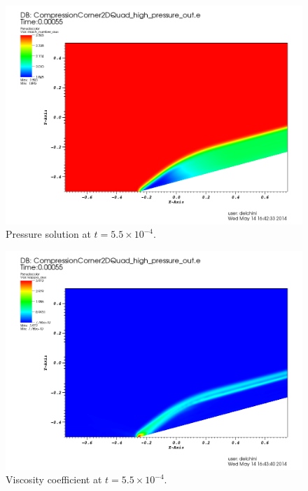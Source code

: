           \begin{figure}[H]%
                \centering
                \includegraphics[scale=.50]{figures/CCDensityTime0p00055.png}
                \caption{Pressure solution at $t=5.5 \times 10^{-4}$.}
                \label{fig:2d_cpc_rho_055}
        \end{figure}%
        \begin{figure}[H]%
                \centering
                \includegraphics[scale=.50]{figures/CCViscosityTime0p00055.png}
                \caption{Viscosity coefficient at $t=5.5 \times 10^{-4}$.}
                \label{fig:2d_cpc_visc_055}
        \end{figure}
